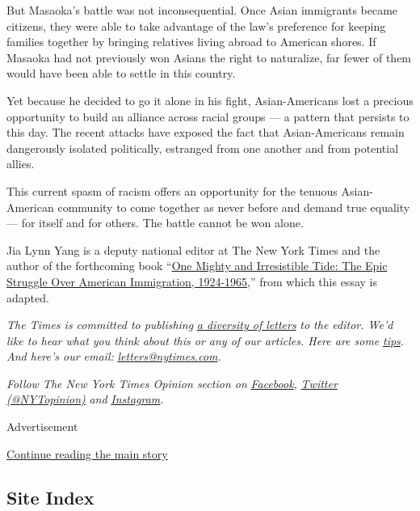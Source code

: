 But Masaoka's battle was not inconsequential. Once Asian immigrants
became citizens, they were able to take advantage of the law's
preference for keeping families together by bringing relatives living
abroad to American shores. If Masaoka had not previously won Asians the
right to naturalize, far fewer of them would have been able to settle in
this country.

Yet because he decided to go it alone in his fight, Asian-Americans lost
a precious opportunity to build an alliance across racial groups --- a
pattern that persists to this day. The recent attacks have exposed the
fact that Asian-Americans remain dangerously isolated politically,
estranged from one another and from potential allies.

This current spasm of racism offers an opportunity for the tenuous
Asian-American community to come together as never before and demand
true equality --- for itself and for others. The battle cannot be won
alone.

Jia Lynn Yang is a deputy national editor at The New York Times and the
author of the forthcoming book ``\href{https://www.jialynnyang.com/}{One
Mighty and Irresistible Tide: The Epic Struggle Over American
Immigration, 1924-1965},'' from which this essay is adapted.

\emph{The Times is committed to publishing}
\href{https://www.nytimes.com/2019/01/31/opinion/letters/letters-to-editor-new-york-times-women.html}{\emph{a
diversity of letters}} \emph{to the editor. We'd like to hear what you
think about this or any of our articles. Here are some}
\href{https://help.nytimes.com/hc/en-us/articles/115014925288-How-to-submit-a-letter-to-the-editor}{\emph{tips}}\emph{.
And here's our email:}
\href{mailto:letters@nytimes.com}{\emph{letters@nytimes.com}}\emph{.}

\emph{Follow The New York Times Opinion section on}
\href{https://www.facebook.com/nytopinion}{\emph{Facebook}}\emph{,}
\href{http://twitter.com/NYTOpinion}{\emph{Twitter (@NYTopinion)}}
\emph{and}
\href{https://www.instagram.com/nytopinion/}{\emph{Instagram}}\emph{.}

Advertisement

\protect\hyperlink{after-bottom}{Continue reading the main story}

\hypertarget{site-index}{%
\subsection{Site Index}\label{site-index}}

